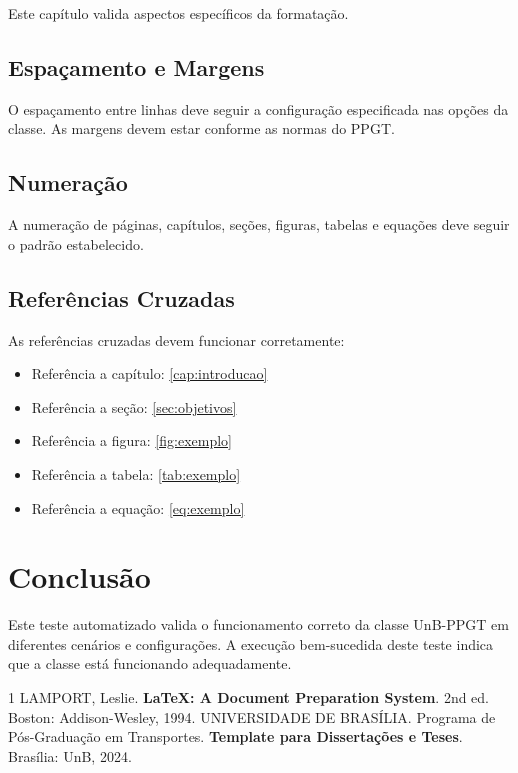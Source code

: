 \documentclass[mestrado,onehalfspacing,12pt,hyperref]{UnB-PPGT}
\begin{document}
Este capítulo valida aspectos específicos da formatação.

\section{Espaçamento e Margens}
\label{sec:espacamento}

O espaçamento entre linhas deve seguir a configuração especificada nas opções da classe. As margens devem estar conforme as normas do PPGT.

\section{Numeração}
\label{sec:numeracao}

A numeração de páginas, capítulos, seções, figuras, tabelas e equações deve seguir o padrão estabelecido.

\section{Referências Cruzadas}
\label{sec:referencias}

As referências cruzadas devem funcionar corretamente:
\begin{itemize}
\item Referência a capítulo: \autoref{cap:introducao}
\item Referência a seção: \autoref{sec:objetivos}
\item Referência a figura: \autoref{fig:exemplo}
\item Referência a tabela: \autoref{tab:exemplo}
\item Referência a equação: \autoref{eq:exemplo}
\end{itemize}

\chapter{Conclusão}
\label{cap:conclusao}

Este teste automatizado valida o funcionamento correto da classe UnB-PPGT em diferentes cenários e configurações. A execução bem-sucedida deste teste indica que a classe está funcionando adequadamente.

\postextual

\begin{thebibliography}{1}
 LAMPORT, Leslie. \textbf{LaTeX: A Document Preparation System}. 2nd ed. Boston: Addison-Wesley, 1994.
 UNIVERSIDADE DE BRASÍLIA. Programa de Pós-Graduação em Transportes. \textbf{Template para Dissertações e Teses}. Brasília: UnB, 2024.
\end{thebibliography}
\end{document}
